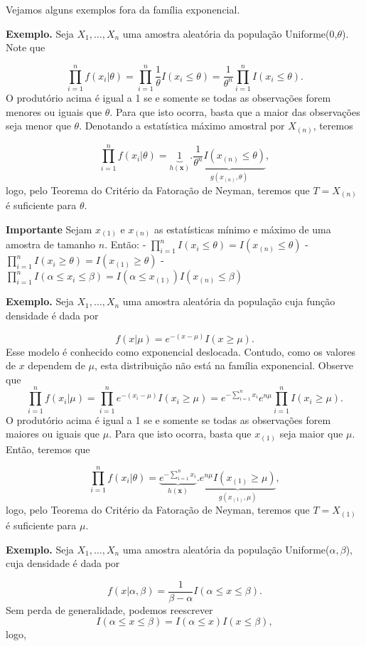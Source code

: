 \documentclass[
  letterpaper,
  DIV=11,
  numbers=noendperiod]{scrartcl}
\begin{document}
Vejamos alguns exemplos fora da família exponencial.

\textbf{Exemplo.} Seja \(X_1,\ldots,X_n\) uma amostra aleatória da
população Uniforme(0,\(\theta\)). Note que

\[\prod_{i=1}^n f(x_i|\theta)=\prod_{i=1}^n \frac{1}{\theta}I(x_i\leq \theta)=\frac{1}{\theta^n}\prod_{i=1}^{n}I(x_i\leq \theta).\]
O produtório acima é igual a 1 se e somente se todas as observações
forem menores ou iguais que \(\theta\). Para que isto ocorra, basta que
a maior das observações seja menor que \(\theta\). Denotando a
estatística máximo amostral por \(X_{(n)}\), teremos

\[\prod_{i=1}^nf(x_i|\theta)=\underbrace{1}_{h(\textbf{x})}.\underbrace{\frac{1}{\theta^n}I(x_{(n)}\leq\theta)}_{g(x_{(n)},\theta)},\]
logo, pelo Teorema do Critério da Fatoração de Neyman, teremos que
\(T=X_{(n)}\) é suficiente para \(\theta\).

\textbf{Importante} Sejam \(x_{(1)}\) e \(x_{(n)}\) as estatísticas
mínimo e máximo de uma amostra de tamanho \(n\). Então: -
\(\prod_{i=1}^n I(x_i\leq \theta)=I(x_{(n)}\leq \theta)\) -
\(\prod_{i=1}^n I(x_i\geq \theta)=I(x_{(1)}\geq \theta)\) -
\(\prod_{i=1}^n I(\alpha\leq x_i\leq \beta)=I(\alpha\leq x_{(1)})I(x_{(n)}\leq \beta)\)

\textbf{Exemplo.} Seja \(X_1,\ldots,X_n\) uma amostra aleatória da
população cuja função densidade é dada por

\[f(x|\mu)=e^{-(x-\mu)}I(x\geq \mu).\] Esse modelo é conhecido como
exponencial deslocada. Contudo, como os valores de \(x\) dependem de
\(\mu\), esta distribuição não está na família exponencial. Observe que
\[\prod_{i=1}^n f(x_i|\mu)=\prod_{i=1}^n e^{-(x_i-\mu)}I(x_i\geq \mu)=e^{-\sum_{i=1}^n x_i}e^{n\mu}\prod_{i=1}^{n}I(x_i\geq \mu).\]
O produtório acima é igual a 1 se e somente se todas as observações
forem maiores ou iguais que \(\mu\). Para que isto ocorra, basta que
\(x_{(1)}\) seja maior que \(\mu\). Então, teremos que

\[\prod_{i=1}^nf(x_i|\theta)=\underbrace{e^{-\sum_{i=1}^n x_i}}_{h(\textbf{x})}.\underbrace{e^{n\mu}I(x_{(1)}\geq \mu)}_{g(x_{(1)},\mu)},\]
logo, pelo Teorema do Critério da Fatoração de Neyman, teremos que
\(T=X_{(1)}\) é suficiente para \(\mu\).

\textbf{Exemplo.} Seja \(X_1,\ldots,X_n\) uma amostra aleatória da
população Uniforme(\(\alpha,\beta\)), cuja densidade é dada por

\[f(x|\alpha,\beta)=\frac{1}{\beta-\alpha}I(\alpha\leq x\leq \beta).\]
Sem perda de generalidade, podemos reescrever
\[I(\alpha\leq x\leq \beta)=I(\alpha\leq x)I(x\leq\beta),\] logo,
\end{document}
